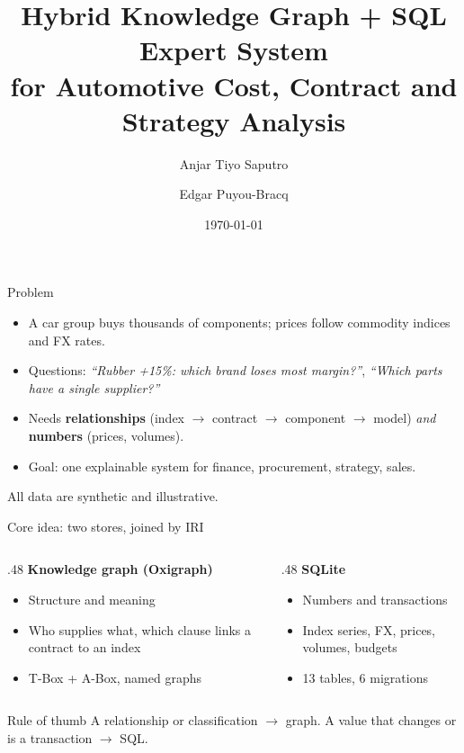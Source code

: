 \documentclass[aspectratio=169,11pt]{beamer}
\title{Hybrid Knowledge Graph + SQL Expert System\\for Automotive Cost, Contract and Strategy Analysis}
\author{Anjar Tiyo Saputro \and Edgar Puyou-Bracq}
\institute{Artificial Intelligence Principles\\Department of Computer Science and Electronics\\Universitas Gadjah Mada}
\date{\today}
\begin{document}
\begin{frame}[plain]\titlepage\end{frame}

\begin{frame}{Problem}
\begin{itemize}
\item A car group buys thousands of components; prices follow \alert{commodity indices} and \alert{FX rates}.
\item Questions: \emph{``Rubber +15\%: which brand loses most margin?''}, \emph{``Which parts have a single supplier?''}
\item Needs \textbf{relationships} (index $\to$ contract $\to$ component $\to$ model) \emph{and} \textbf{numbers} (prices, volumes).
\item Goal: one explainable system for finance, procurement, strategy, sales.
\end{itemize}
\vfill\footnotesize All data are synthetic and illustrative.
\end{frame}

\begin{frame}{Core idea: two stores, joined by IRI}
\begin{columns}[T]
\begin{column}{.48\textwidth}
\textbf{Knowledge graph (Oxigraph)}
\begin{itemize}\small
\item Structure and meaning
\item Who supplies what, which clause links a contract to an index
\item T-Box + A-Box, named graphs
\end{itemize}
\end{column}
\begin{column}{.48\textwidth}
\textbf{SQLite}
\begin{itemize}\small
\item Numbers and transactions
\item Index series, FX, prices, volumes, budgets
\item 13 tables, 6 migrations
\end{itemize}
\end{column}
\end{columns}
\vspace{4mm}
\begin{block}{Rule of thumb}
A relationship or classification $\to$ graph. A value that changes or is a transaction $\to$ SQL.
\end{block}
\end{frame}
\end{document}
